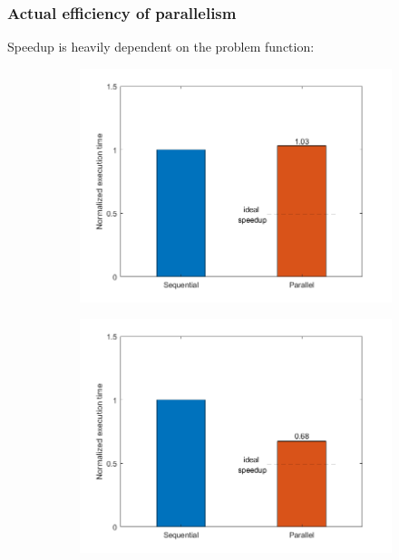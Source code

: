 \documentclass{beamer}
\begin{document}
\begin{frame} %
	\frametitle{Actual efficiency of parallelism}
	Speedup is heavily dependent on the problem function:
	\begin{figure}
		\begin{subfigure}{.5\textwidth}
			\includegraphics[width=\linewidth]{etc/test5_2.jpeg}
		\end{subfigure}%
		\begin{subfigure}{.5\textwidth}
			\includegraphics[width=\linewidth]{etc/test6_2.jpeg}
		\end{subfigure}%
	\end{figure}
\end{frame}
\end{document}
